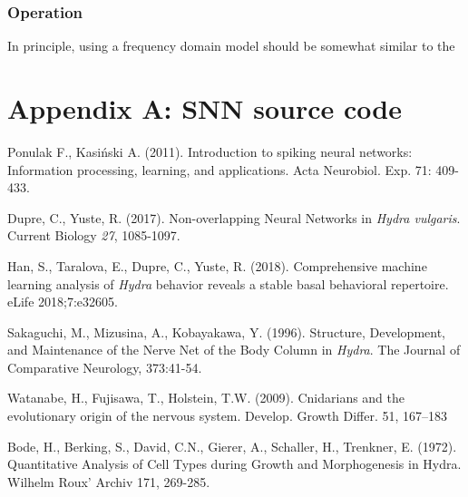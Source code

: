 \documentclass{article}
\begin{document}

\subsubsection{Operation}


In principle, using a frequency domain model should be somewhat similar to the 






\section*{Appendix A: SNN source code}



\newpage

\begin{thebibliography}{6}
    Ponulak F., Kasiński A. (2011).
    Introduction to spiking neural networks: Information processing, learning, and applications.
    Acta Neurobiol. Exp. 71: 409-433.
  
    Dupre, C., Yuste, R. (2017). Non-overlapping Neural Networks in \textit{Hydra vulgaris}. Current Biology \textit{27}, 1085-1097.
    
    Han, S., Taralova, E., Dupre, C., Yuste, R. (2018).
    Comprehensive machine learning analysis of \textit{Hydra} behavior reveals a stable basal behavioral repertoire.
    eLife 2018;7:e32605.
    
    Sakaguchi, M., Mizusina, A., Kobayakawa, Y. (1996).
    Structure, Development, and Maintenance of the Nerve Net of the Body Column in \textit{Hydra}.
    The Journal of Comparative Neurology, 373:41-54.
    
    Watanabe, H., Fujisawa, T., Holstein, T.W. (2009).
    Cnidarians and the evolutionary origin of the nervous system.
    Develop. Growth Differ. 51, 167–183
    
    Bode, H., Berking, S., David, C.N., Gierer, A., Schaller, H., Trenkner, E. (1972).
    Quantitative Analysis of Cell Types during Growth and Morphogenesis in Hydra.
    Wilhelm Roux' Archiv 171, 269-285.

\end{thebibliography}
\end{document}
